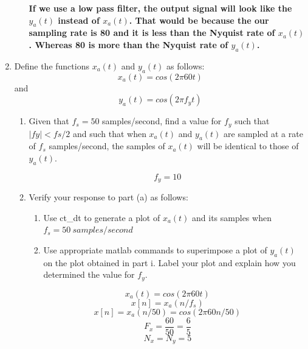 \documentclass[12pt]{article}
\begin{document}
\begin{enumerate}
\begin{enumerate}
\textbf{If we use a low pass filter, the output signal will look like the $y_a(t)$ instead of $x_a(t)$. That would be because the our sampling rate is 80 and it is less than the Nyquist rate of $x_a(t)$. Whereas 80 is more than the Nyquist rate of $y_a(t)$.}

\end{enumerate}






\item Define the functions $x_a(t)$ and $y_a(t)$ as follows:
$$x_a(t) = cos(2\pi 60 t)$$ 
and 
$$y_a(t) =  cos(2\pi f_y t)$$
\begin{enumerate}









\item Given that $f_s = 50$ samples/second, find a value for $f_y$ such that $|fy|< fs/2$ and such that when $x_a(t)$ and $y_a(t)$ are sampled at a rate of $f_s$ samples/second, the samples of $x_a(t)$ will be identical to those of $y_a(t)$.



$$\boxed{f_y = 10}$$










\item Verify your response to part (a) as follows:
\begin{enumerate}

\item Use ct\_dt to generate a plot of $x_a(t)$ and its samples when $f_s = 50\ samples/second$
\item Use appropriate matlab commands to superimpose a plot of $y_a(t)$ on the plot obtained in part i. Label your plot and explain how you determined the value for
$f_y$.
\end{enumerate}
$$x_a(t) = cos(2\pi60t)$$
$$x[n] = x_a(n/f_s)$$
$$x[n] = x_a(n/50) = cos(2\pi60n/50)$$
$$F_x = \frac{60}{50} = \frac{6}{5}$$
$$N_x = N_y = 5$$


\end{enumerate}
\end{enumerate}
\end{document}
